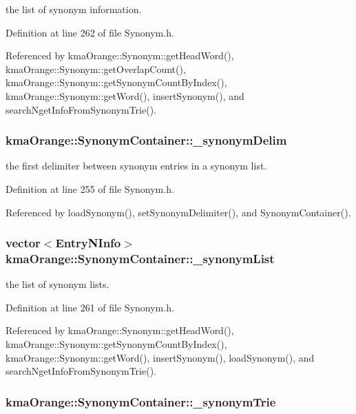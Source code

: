 the list of synonym information. 



Definition at line 262 of file Synonym.h.

Referenced by kmaOrange::Synonym::getHeadWord(), kmaOrange::Synonym::getOverlapCount(), kmaOrange::Synonym::getSynonymCountByIndex(), kmaOrange::Synonym::getWord(), insertSynonym(), and searchNgetInfoFromSynonymTrie().\hypertarget{classkmaOrange_1_1SynonymContainer_9a333e812f4d65777c358e96370c6d59}{
\subsubsection[{\_\-synonymDelim}]{ {\bf kmaOrange::SynonymContainer::\_\-synonymDelim}}}
\label{classkmaOrange_1_1SynonymContainer_9a333e812f4d65777c358e96370c6d59}


the first delimiter between synonym entries in a synonym list. 



Definition at line 255 of file Synonym.h.

Referenced by loadSynonym(), setSynonymDelimiter(), and SynonymContainer().\hypertarget{classkmaOrange_1_1SynonymContainer_37f7dd0dc8be871b8f2bf23188bd3098}{
\subsubsection[{\_\-synonymList}]{\setlength{\rightskip}{0pt plus 5cm}vector$<${\bf EntryNInfo}$>$ {\bf kmaOrange::SynonymContainer::\_\-synonymList}}}
\label{classkmaOrange_1_1SynonymContainer_37f7dd0dc8be871b8f2bf23188bd3098}


the list of synonym lists. 



Definition at line 261 of file Synonym.h.

Referenced by kmaOrange::Synonym::getHeadWord(), kmaOrange::Synonym::getSynonymCountByIndex(), kmaOrange::Synonym::getWord(), insertSynonym(), loadSynonym(), and searchNgetInfoFromSynonymTrie().\hypertarget{classkmaOrange_1_1SynonymContainer_a018e277349ba2dc83623bd8b86dfcc0}{
\subsubsection[{\_\-synonymTrie}]{ {\bf kmaOrange::SynonymContainer::\_\-synonymTrie}}}
\label{classkmaOrange_1_1SynonymContainer_a018e277349ba2dc83623bd8b86dfcc0}


